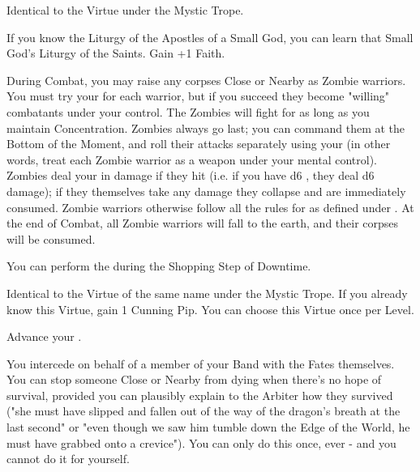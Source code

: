 \begin{multicols*}{2}

Identical to the  Virtue under the Mystic Trope.


If you know the Liturgy of the Apostles of a Small God, you can learn that Small God's Liturgy of the Saints. Gain +1 \MAX Faith.

\newpage


During Combat, you may raise any corpses Close or Nearby as Zombie warriors. You must try your \JUJU for each warrior, but if you succeed they become "willing" combatants under your control. The Zombies will fight for as long as you maintain Concentration. Zombies always go last; you can command them at the Bottom of the Moment, and roll their attacks separately using your \FOC (in other words, treat each Zombie warrior as a \FOC weapon under your mental control). Zombies deal your \JUJU in damage if they hit (i.e. if you have d6 \JUJU, they deal d6 damage); if they themselves take any damage they collapse and are immediately consumed. Zombie warriors otherwise follow all the rules for  as defined under .  At the end of Combat, all Zombie warriors will fall to the earth, and their corpses will be consumed. 


You can perform the  during the Shopping Step of Downtime. 



Identical to the Virtue of the same name under the Mystic Trope. If you already know this Virtue, gain 1 Cunning Pip. You can choose this Virtue once per Level.



Advance your \JUJU \DCUP.  



You intercede on behalf of a member of your Band with the Fates themselves.  You can stop someone Close or Nearby from dying when there's no hope of survival, provided you can plausibly explain to the Arbiter how they survived ("she must have slipped and fallen out of the way of the dragon's breath at the last second" or "even though we saw him tumble down the Edge of the World, he must have grabbed onto a crevice").  You can only do this once, ever - and you cannot do it for yourself. 


\end{multicols*}
